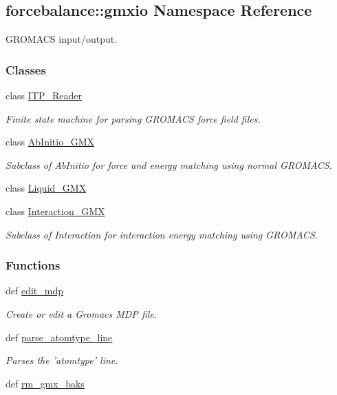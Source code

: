\hypertarget{namespaceforcebalance_1_1gmxio}{\subsection{forcebalance\-:\-:gmxio \-Namespace \-Reference}
\label{namespaceforcebalance_1_1gmxio}
}


\-G\-R\-O\-M\-A\-C\-S input/output.  


\subsubsection*{\-Classes}
\begin{DoxyCompactItemize}
\item 
class \hyperlink{classforcebalance_1_1gmxio_1_1ITP__Reader}{\-I\-T\-P\-\_\-\-Reader}
\begin{DoxyCompactList}\small\item\em \-Finite state machine for parsing \-G\-R\-O\-M\-A\-C\-S force field files. \end{DoxyCompactList}\item 
class \hyperlink{classforcebalance_1_1gmxio_1_1AbInitio__GMX}{\-Ab\-Initio\-\_\-\-G\-M\-X}
\begin{DoxyCompactList}\small\item\em \-Subclass of \-Ab\-Initio for force and energy matching using normal \-G\-R\-O\-M\-A\-C\-S. \end{DoxyCompactList}\item 
class \hyperlink{classforcebalance_1_1gmxio_1_1Liquid__GMX}{\-Liquid\-\_\-\-G\-M\-X}
\item 
class \hyperlink{classforcebalance_1_1gmxio_1_1Interaction__GMX}{\-Interaction\-\_\-\-G\-M\-X}
\begin{DoxyCompactList}\small\item\em \-Subclass of \-Interaction for interaction energy matching using \-G\-R\-O\-M\-A\-C\-S. \end{DoxyCompactList}\end{DoxyCompactItemize}
\subsubsection*{\-Functions}
\begin{DoxyCompactItemize}
\item 
def \hyperlink{namespaceforcebalance_1_1gmxio_acc5bef2c5c991cd70a948a1dd43ef6a6}{edit\-\_\-mdp}
\begin{DoxyCompactList}\small\item\em \-Create or edit a \-Gromacs \-M\-D\-P file. \end{DoxyCompactList}\item 
def \hyperlink{namespaceforcebalance_1_1gmxio_a29af6ace00d7e58258e0a854ca13d954}{parse\-\_\-atomtype\-\_\-line}
\begin{DoxyCompactList}\small\item\em \-Parses the 'atomtype' line. \end{DoxyCompactList}\item 
def \hyperlink{namespaceforcebalance_1_1gmxio_acac8488f29b62fb0d4cb54bb5a041026}{rm\-\_\-gmx\-\_\-baks}
\end{DoxyCompactItemize}
